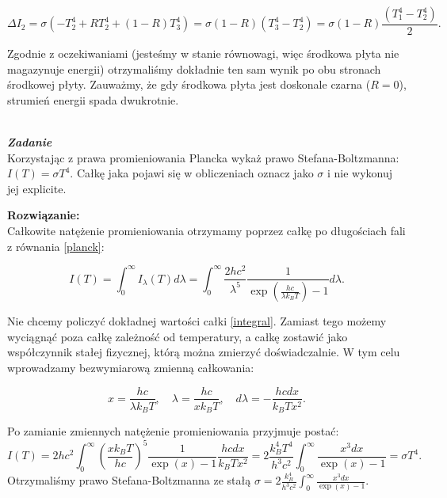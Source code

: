\documentclass[11pt,a4paper]{article}
\newcounter{zadanie}\newcommand{\zadanie}[1][]{\addtocounter{zadanie}{1} ~\\  {\bf \emph{Zadanie \arabic{zadanie} #1 }} \\}
\begin{document}
\begin{equation}
  \Delta I_2 = \sigma (  -T_2^4 + R T_2^4 + (1-R)T_3^4) =
  \sigma (1-R) (T_3^4-T_2^4) = \sigma(1-R) \frac{(T_1^4-T_2^4)}{2}.
\end{equation}

Zgodnie z oczekiwaniami (jesteśmy w stanie równowagi, więc środkowa płyta nie magazynuje energii)
otrzymaliśmy dokładnie ten sam wynik po obu stronach środkowej płyty. Zauważmy, że gdy środkowa płyta
jest doskonale czarna ($R=0$), strumień energii spada dwukrotnie.

\newpage

\zadanie
Korzystając z prawa promieniowania Plancka wykaż prawo Stefana-Boltzmanna:  $I(T) = \sigma T^4$.
Całkę jaka pojawi się w obliczeniach oznacz jako $\sigma$ i nie wykonuj jej explicite.


\vskip 10pt
\textbf{Rozwiązanie:}\\
Całkowite natężenie promieniowania otrzymamy poprzez całkę po długościach fali z równania \eqref{planck}:

\begin{equation}
  I(T) = \int_0^\infty I_\lambda(T) d\lambda =
  \int_0^\infty \frac{2 h c^2}{\lambda^5} \frac{1}{\exp\left(\frac{h c}{\lambda k_B T}\right)-1} d\lambda. \label{integral}
\end{equation}

Nie chcemy policzyć dokładnej wartości całki \eqref{integral}. Zamiast tego możemy wyciągnąć poza
całkę zależność od temperatury, a całkę zostawić jako współczynnik stałej fizycznej, którą można
zmierzyć doświadczalnie. W tym celu wprowadzamy bezwymiarową zmienną całkowania:

\begin{equation}
x = \frac{h c}{\lambda k_B T}, \quad \lambda = \frac{h c}{x k_B T},\quad d\lambda = - \frac{h c dx}{k_B T x^2}.
\end{equation}

Po zamianie zmiennych natężenie promieniowania przyjmuje postać:
\begin{equation}
  I(T) = 2 h c^2 \int_0^\infty \left(\frac{xk_B T}{hc}\right)^5 \frac{1}{\exp(x)-1}
  \frac{h c dx}{k_B T x^2} =
  2 \frac{k_B^4 T^4}{h^3 c^2} \int_0^\infty \frac{x^3 dx}{\exp(x)-1} = \sigma T^4.
\end{equation}
Otrzymaliśmy prawo Stefana-Boltzmanna ze stałą $\sigma = 2 \frac{k_B^4}{h^3 c^2} \int_0^\infty \frac{x^3 dx}{\exp(x)-1}$.
\end{document}
